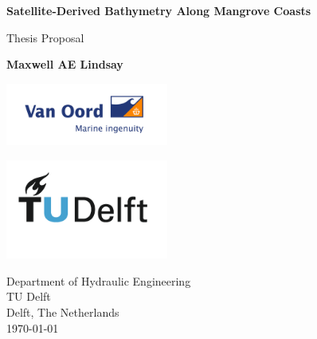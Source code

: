 \begin{titlepage}

  \begin{center}
    \vspace*{1cm}
    \color{black}
    \Huge
    \textbf{Satellite-Derived Bathymetry Along Mangrove Coasts}
    
    \vspace{0.5cm}
    Thesis Proposal
    
    \vspace{1.5cm}
    \Large
    \textbf{Maxwell AE Lindsay}
    
    \large
    \vfill
    
    
    \vspace{0.8cm}
    
    \includegraphics[width=0.4\textwidth]{figures/VanOord-2048x785.png}
    
    \includegraphics[width=0.4\textwidth]{figures/TU_P1_full-color.png}
    
    Department of Hydraulic Engineering\\
    TU Delft\\
    Delft, The Netherlands\\
    \today
    
  \end{center}
\end{titlepage}